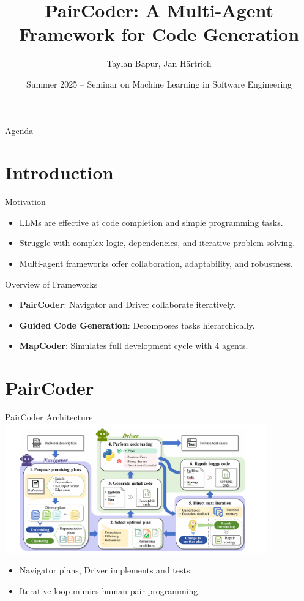 \documentclass{beamer}
\title{PairCoder: A Multi-Agent Framework for Code Generation}
\author{Taylan Bapur, Jan H\"artrich}
\date{Summer 2025 -- Seminar on Machine Learning in Software Engineering}
\begin{document}
	
	\begin{frame}
	  \titlepage
	\end{frame}
	
	\begin{frame}{Agenda}
	  \tableofcontents
	\end{frame}
	
	\section{Introduction}
	\begin{frame}{Motivation}
	  \begin{itemize}
	    \item LLMs are effective at code completion and simple programming tasks.
	    \item Struggle with complex logic, dependencies, and iterative problem-solving.
	    \item Multi-agent frameworks offer collaboration, adaptability, and robustness.
	  \end{itemize}
	\end{frame}
	
	\begin{frame}{Overview of Frameworks}
	  \begin{itemize}
	    \item \textbf{PairCoder}: Navigator and Driver collaborate iteratively.
	    \item \textbf{Guided Code Generation}: Decomposes tasks hierarchically.
	    \item \textbf{MapCoder}: Simulates full development cycle with 4 agents.
	  \end{itemize}
	\end{frame}
	
	\section{PairCoder}
	\begin{frame}{PairCoder Architecture}
	  \includegraphics[width=0.85\textwidth]{paircoder-architecture.png}
	  \begin{itemize}
	    \item Navigator plans, Driver implements and tests.
	    \item Iterative loop mimics human pair programming.
	  \end{itemize}
	\end{frame}
	
\end{document}
